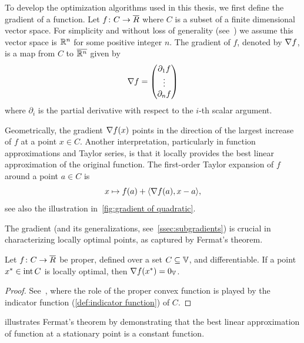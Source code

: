 To develop the optimization algorithms used in this thesis, we first define the gradient of a function.
Let \( f \colon C \to \overline{R} \) where \( C \) is a subset of a finite dimensional vector space.
For simplicity and without loss of generality (see~\cite[theorem 3.7]{Axler2023-ki}) we assume this vector space is \( \mathbb{R}^n \) for some positive integer \( n \).
The gradient of \( f \), denoted by \( \nabla f \), is a map from \( C \) to \( \overline{\mathbb{R}^n} \) given by
\begin{equation}
	\nabla f = \begin{pmatrix}
		\partial_{\num{1}} f \\
		\vdots \\
		\partial_n f
	\end{pmatrix}
\end{equation}
where \( \partial_i \) is the partial derivative with respect to the \( i \)-th scalar argument.

Geometrically, the gradient \( \nabla f(x) \) points in the direction of the largest increase of \( f \) at a point \( x \in C \).
Another interpretation, particularly in function approximations and Taylor series, is that it locally provides the best linear approximation of the original function.
The first-order Taylor expansion of \( f \) around a point \( a \in C \) is
\begin{equation}
	x \mapsto f(a) + \langle \nabla f(a), x - a \rangle,
\end{equation}
see also the illustration in~\cref{fig:gradient of quadratic}.

The gradient (and its generalizations, see~\cref{ssec:subgradients}) is crucial in characterizing locally optimal points, as captured by Fermat's theorem.
\begin{theorem}
	\label{th:fermat}
	Let \( f \colon C \to \overline{R} \) be proper, defined over a set \( C \subseteq \mathbb{V} \), and differentiable.
	If a point \( {x}^\ast \in \operatorname{int} C \) is locally optimal, then \( \nabla f({x}^\ast) = \num{0}_{\mathbb{\mathbb{V}}} \).
\end{theorem}
\begin{proof}
	See~\cite[theorem 3.72]{beck_firstorder_2017}, where the role of the proper convex function is played by the indicator function (\cref{def:indicator function}) of \( C \).
\end{proof}
 illustrates Fermat's theorem by demonstrating that the best linear approximation of function at a stationary point is a constant function.
\begin{sidefigure}
	\centering
	\caption[Graphical interpretation of Fermat's theorem on stationary points]{%
		Graphical interpretation of Fermat's theorem on stationary points.
		At a stationary point (here, \num{1}), the best linear approximation to the green function is a constant function.%
	}
	\label{fig:fermat}
\end{sidefigure}
